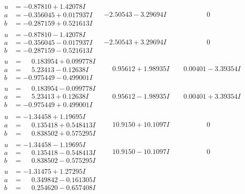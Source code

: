 \documentclass[1p]{elsarticle_modified}
\theoremstyle{definition}
\begin{document}
$$\begin{array}{c|c|c}
\begin{aligned}
u &= -0.87810 + 1.42078 I \\
a &= -0.356045 + 0.017937 I \\
b &= -0.287159 + 0.521613 I\end{aligned}
 & -2.50543 - 3.29694 I & \phantom{-0.000000 } 0 \\ \hline\begin{aligned}
u &= -0.87810 - 1.42078 I \\
a &= -0.356045 - 0.017937 I \\
b &= -0.287159 - 0.521613 I\end{aligned}
 & -2.50543 + 3.29694 I & \phantom{-0.000000 } 0 \\ \hline\begin{aligned}
u &= \phantom{-}0.183954 + 0.099778 I \\
a &= \phantom{-}5.23413 - 0.12638 I \\
b &= -0.975449 - 0.499001 I\end{aligned}
 & \phantom{-}0.95612 + 1.98935 I & \phantom{-}0.00401 - 3.39354 I \\ \hline\begin{aligned}
u &= \phantom{-}0.183954 - 0.099778 I \\
a &= \phantom{-}5.23413 + 0.12638 I \\
b &= -0.975449 + 0.499001 I\end{aligned}
 & \phantom{-}0.95612 - 1.98935 I & \phantom{-}0.00401 + 3.39354 I \\ \hline\begin{aligned}
u &= -1.34458 + 1.19695 I \\
a &= \phantom{-}0.135418 + 0.548413 I \\
b &= \phantom{-}0.838502 + 0.575295 I\end{aligned}
 & \phantom{-}10.9150 + 10.1097 I & \phantom{-0.000000 } 0 \\ \hline\begin{aligned}
u &= -1.34458 - 1.19695 I \\
a &= \phantom{-}0.135418 - 0.548413 I \\
b &= \phantom{-}0.838502 - 0.575295 I\end{aligned}
 & \phantom{-}10.9150 - 10.1097 I & \phantom{-0.000000 } 0 \\ \hline\begin{aligned}
u &= -1.31475 + 1.27295 I \\
a &= \phantom{-}0.349842 - 0.161305 I \\
b &= \phantom{-}0.254620 - 0.657408 I\end{aligned}

\end{array}$$
\end{document}
